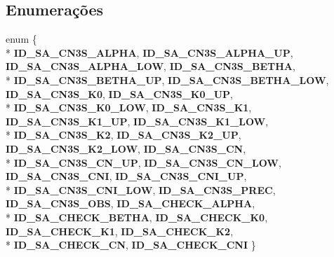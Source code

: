 \subsection*{Enumerações}
\begin{DoxyCompactItemize}
\item 
enum \{ \\*
{\bf I\+D\+\_\+\+S\+A\+\_\+\+C\+N3\+S\+\_\+\+A\+L\+P\+HA}, 
{\bf I\+D\+\_\+\+S\+A\+\_\+\+C\+N3\+S\+\_\+\+A\+L\+P\+H\+A\+\_\+\+UP}, 
{\bf I\+D\+\_\+\+S\+A\+\_\+\+C\+N3\+S\+\_\+\+A\+L\+P\+H\+A\+\_\+\+L\+OW}, 
{\bf I\+D\+\_\+\+S\+A\+\_\+\+C\+N3\+S\+\_\+\+B\+E\+T\+HA}, 
\\*
{\bf I\+D\+\_\+\+S\+A\+\_\+\+C\+N3\+S\+\_\+\+B\+E\+T\+H\+A\+\_\+\+UP}, 
{\bf I\+D\+\_\+\+S\+A\+\_\+\+C\+N3\+S\+\_\+\+B\+E\+T\+H\+A\+\_\+\+L\+OW}, 
{\bf I\+D\+\_\+\+S\+A\+\_\+\+C\+N3\+S\+\_\+\+K0}, 
{\bf I\+D\+\_\+\+S\+A\+\_\+\+C\+N3\+S\+\_\+\+K0\+\_\+\+UP}, 
\\*
{\bf I\+D\+\_\+\+S\+A\+\_\+\+C\+N3\+S\+\_\+\+K0\+\_\+\+L\+OW}, 
{\bf I\+D\+\_\+\+S\+A\+\_\+\+C\+N3\+S\+\_\+\+K1}, 
{\bf I\+D\+\_\+\+S\+A\+\_\+\+C\+N3\+S\+\_\+\+K1\+\_\+\+UP}, 
{\bf I\+D\+\_\+\+S\+A\+\_\+\+C\+N3\+S\+\_\+\+K1\+\_\+\+L\+OW}, 
\\*
{\bf I\+D\+\_\+\+S\+A\+\_\+\+C\+N3\+S\+\_\+\+K2}, 
{\bf I\+D\+\_\+\+S\+A\+\_\+\+C\+N3\+S\+\_\+\+K2\+\_\+\+UP}, 
{\bf I\+D\+\_\+\+S\+A\+\_\+\+C\+N3\+S\+\_\+\+K2\+\_\+\+L\+OW}, 
{\bf I\+D\+\_\+\+S\+A\+\_\+\+C\+N3\+S\+\_\+\+CN}, 
\\*
{\bf I\+D\+\_\+\+S\+A\+\_\+\+C\+N3\+S\+\_\+\+C\+N\+\_\+\+UP}, 
{\bf I\+D\+\_\+\+S\+A\+\_\+\+C\+N3\+S\+\_\+\+C\+N\+\_\+\+L\+OW}, 
{\bf I\+D\+\_\+\+S\+A\+\_\+\+C\+N3\+S\+\_\+\+C\+NI}, 
{\bf I\+D\+\_\+\+S\+A\+\_\+\+C\+N3\+S\+\_\+\+C\+N\+I\+\_\+\+UP}, 
\\*
{\bf I\+D\+\_\+\+S\+A\+\_\+\+C\+N3\+S\+\_\+\+C\+N\+I\+\_\+\+L\+OW}, 
{\bf I\+D\+\_\+\+S\+A\+\_\+\+C\+N3\+S\+\_\+\+P\+R\+EC}, 
{\bf I\+D\+\_\+\+S\+A\+\_\+\+C\+N3\+S\+\_\+\+O\+BS}, 
{\bf I\+D\+\_\+\+S\+A\+\_\+\+C\+H\+E\+C\+K\+\_\+\+A\+L\+P\+HA}, 
\\*
{\bf I\+D\+\_\+\+S\+A\+\_\+\+C\+H\+E\+C\+K\+\_\+\+B\+E\+T\+HA}, 
{\bf I\+D\+\_\+\+S\+A\+\_\+\+C\+H\+E\+C\+K\+\_\+\+K0}, 
{\bf I\+D\+\_\+\+S\+A\+\_\+\+C\+H\+E\+C\+K\+\_\+\+K1}, 
{\bf I\+D\+\_\+\+S\+A\+\_\+\+C\+H\+E\+C\+K\+\_\+\+K2}, 
\\*
{\bf I\+D\+\_\+\+S\+A\+\_\+\+C\+H\+E\+C\+K\+\_\+\+CN}, 
{\bf I\+D\+\_\+\+S\+A\+\_\+\+C\+H\+E\+C\+K\+\_\+\+C\+NI}
 \}
\end{DoxyCompactItemize}
